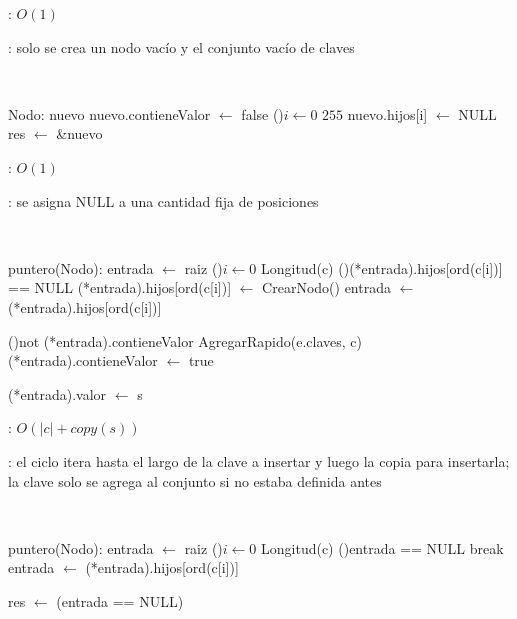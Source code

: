 \complejidad: $O(1)$

\justifcomp: solo se crea un nodo vacío y el conjunto vacío de claves

~

\begin{algorithm}[H]
	\NoCaptionOfAlgo
	\caption{}
	Nodo: nuevo 
	nuevo.contieneValor $\leftarrow$ false 
	\For(){$i \leftarrow 0$ \KwTo $255$}{ 
		nuevo.hijos[i] $\leftarrow$ NULL 
	}
	res $\leftarrow$ \&nuevo 
\end{algorithm}

\complejidad: $O(1)$

\justifcomp: se asigna NULL a una cantidad fija de posiciones

~

\begin{algorithm}[H]
	\NoCaptionOfAlgo
	\caption{}
	puntero(Nodo): entrada $\leftarrow$ raiz 
	\For(){$i \leftarrow 0$ \KwTo Longitud(c)}{
		\If(){(*entrada).hijos[ord(c[i])] == NULL} {
			(*entrada).hijos[ord(c[i])] $\leftarrow$ CrearNodo() 
		}
		entrada $\leftarrow$ (*entrada).hijos[ord(c[i])] 
	}

	\If(){not (*entrada).contieneValor} {
		AgregarRapido(e.claves, c) 
		(*entrada).contieneValor $\leftarrow$ true 
	}

	(*entrada).valor $\leftarrow$ s 
\end{algorithm}

\complejidad: $O(|c| + copy(s))$

\justifcomp: el ciclo itera hasta el largo de la clave a insertar y luego la copia para insertarla; la clave solo se agrega al conjunto si no estaba definida antes

~

\begin{algorithm}[H]
	\NoCaptionOfAlgo
	\caption{}
	puntero(Nodo): entrada $\leftarrow$ raiz 
	\For(){$i \leftarrow 0$ \KwTo Longitud(c)}{
		\lIf(){entrada == NULL} {break}
		entrada $\leftarrow$ (*entrada).hijos[ord(c[i])] 
	}

	res $\leftarrow$ (entrada == NULL) 
\end{algorithm}

